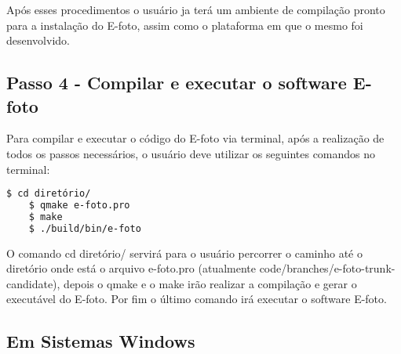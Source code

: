 Após esses procedimentos o usuário ja terá um ambiente de compilação pronto para a instalação do E-foto, assim como o plataforma em que o mesmo foi desenvolvido.
    
\subsection{Passo 4 - Compilar e executar o software E-foto}
Para compilar e executar o código do E-foto via terminal, após a realização de todos os passos necessários, o usuário deve utilizar os seguintes comandos no terminal:
\begin{lstlisting}[language=bash]
   	$ cd diretório/
   	$ qmake e-foto.pro
   	$ make
   	$ ./build/bin/e-foto
\end{lstlisting}
   
O comando cd diretório/ servirá para o usuário percorrer o caminho até o diretório onde está o arquivo e-foto.pro (atualmente code/branches/e-foto-trunk-candidate), depois o qmake e o make irão realizar a compilação e gerar o executável do E-foto. Por fim o último comando irá executar o software E-foto.
   

\subsection{Em Sistemas Windows}


